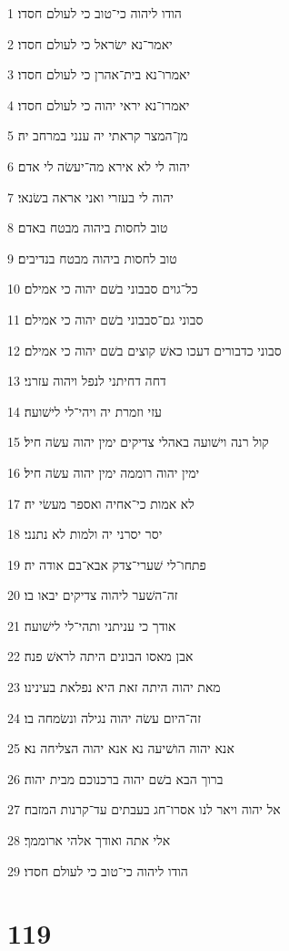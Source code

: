 \par 1 הודו ליהוה כי־טוב כי לעולם חסדו׃
\par 2 יאמר־נא ישׂראל כי לעולם חסדו׃
\par 3 יאמרו־נא בית־אהרן כי לעולם חסדו׃
\par 4 יאמרו־נא יראי יהוה כי לעולם חסדו׃
\par 5 מן־המצר קראתי יה ענני במרחב יה׃
\par 6 יהוה לי לא אירא מה־יעשׂה לי אדם׃
\par 7 יהוה לי בעזרי ואני אראה בשׂנאי׃
\par 8 טוב לחסות ביהוה מבטח באדם׃
\par 9 טוב לחסות ביהוה מבטח בנדיבים׃
\par 10 כל־גוים סבבוני בשׁם יהוה כי אמילם׃
\par 11 סבוני גם־סבבוני בשׁם יהוה כי אמילם׃
\par 12 סבוני כדבורים דעכו כאשׁ קוצים בשׁם יהוה כי אמילם׃
\par 13 דחה דחיתני לנפל ויהוה עזרני׃
\par 14 עזי וזמרת יה ויהי־לי לישׁועה׃
\par 15 קול רנה וישׁועה באהלי צדיקים ימין יהוה עשׂה חיל׃
\par 16 ימין יהוה רוממה ימין יהוה עשׂה חיל׃
\par 17 לא אמות כי־אחיה ואספר מעשׂי יה׃
\par 18 יסר יסרני יה ולמות לא נתנני׃
\par 19 פתחו־לי שׁערי־צדק אבא־בם אודה יה׃
\par 20 זה־השׁער ליהוה צדיקים יבאו בו׃
\par 21 אודך כי עניתני ותהי־לי לישׁועה׃
\par 22 אבן מאסו הבונים היתה לראשׁ פנה׃
\par 23 מאת יהוה היתה זאת היא נפלאת בעינינו׃
\par 24 זה־היום עשׂה יהוה נגילה ונשׂמחה בו׃
\par 25 אנא יהוה הושׁיעה נא אנא יהוה הצליחה נא׃
\par 26 ברוך הבא בשׁם יהוה ברכנוכם מבית יהוה׃
\par 27 אל יהוה ויאר לנו אסרו־חג בעבתים עד־קרנות המזבח׃
\par 28 אלי אתה ואודך אלהי ארוממך׃
\par 29 הודו ליהוה כי־טוב כי לעולם חסדו׃

\chapter{119}

